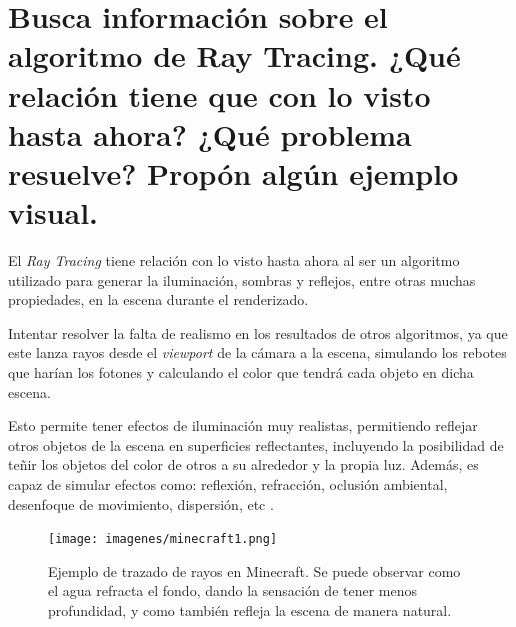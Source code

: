 \documentclass{article}
\begin{document}
\section{Busca información sobre el algoritmo de Ray Tracing. ¿Qué relación tiene que con lo visto hasta ahora? ¿Qué problema resuelve? Propón algún ejemplo visual.}

El \textit{Ray Tracing} tiene relación con lo visto hasta ahora al ser un algoritmo utilizado para generar la iluminación, sombras y reflejos, entre otras muchas propiedades, en la escena durante el renderizado.

\bigskip

Intentar resolver la falta de realismo en los resultados de otros algoritmos, ya que este lanza rayos desde el \textit{viewport} de la cámara a la escena, simulando los rebotes que harían los fotones y calculando el color que tendrá cada objeto en dicha escena. 

\bigskip

Esto permite tener efectos de iluminación muy realistas, permitiendo reflejar otros objetos de la escena en superficies reflectantes, incluyendo la posibilidad de teñir los objetos del color de otros a su alrededor y la propia luz. Además, es capaz de simular efectos como: reflexión, refracción, oclusión ambiental, desenfoque de movimiento, dispersión, etc \cite{raytracing}. 

\begin{figure}[H]
    \centering
    \texttt{[image: imagenes/minecraft1.png]}
    \caption{Ejemplo de trazado de rayos en Minecraft. Se puede observar como el agua refracta el fondo, dando la sensación de tener menos profundidad, y como también refleja la escena de manera natural.}
 \end{figure}
\end{document}
